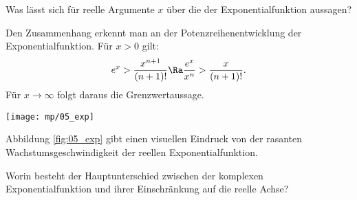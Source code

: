 \begin{frage}\label{05_exwa}
  Was lässt sich für reelle Argumente $x$ über die 
   der Exponentialfunktion 
  aussagen?
\end{frage}

\begin{antwort}
  \noindent   
  Den Zusammenhang erkennt man an der 
  Potenzreihenentwicklung der Exponentialfunktion. 
  Für $x>0$ gilt:
  \[
  e^x > \frac{x^{n+1}}{(n+1)!} \Ra 
  \frac{e^x}{x^n} > \frac{x}{(n+1)!}.
  \]
  Für $x\to\infty$ folgt daraus die Grenzwertaussage. 

  \begin{center}
    \texttt{[image: mp/05\_exp]}
    \label{fig:05_exp}
  \end{center}

  Abbildung \ref{fig:05_exp} gibt einen visuellen Eindruck von der rasanten 
  Wachstumsgeschwindigkeit der reellen Exponentialfunktion.
  \AntEnd
\end{antwort}

\begin{frage}
  Worin besteht der Hauptunterschied zwischen der 
  komplexen Exponentialfunktion 
  und ihrer Einschränkung auf die reelle Achse?
\end{frage}

